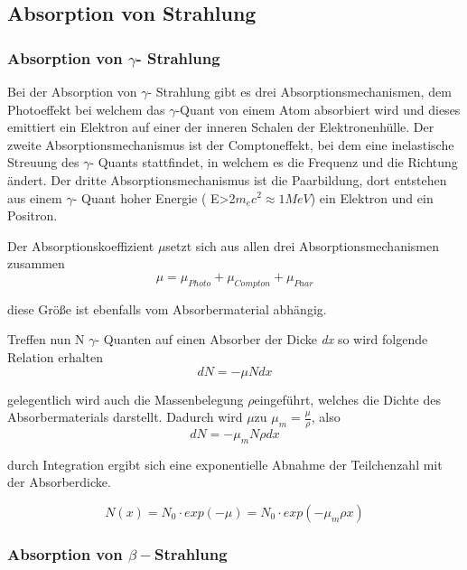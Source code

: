 \subsection{Absorption von Strahlung}


\subsubsection{Absorption von $\gamma$- Strahlung}

Bei der Absorption von $\gamma$- Strahlung gibt es drei Absorptionsmechanismen,
dem Photoeffekt bei welchem das $\gamma$-Quant von einem Atom absorbiert
wird und dieses emittiert ein Elektron auf einer der inneren Schalen
der Elektronenhülle. Der zweite Absorptionsmechanismus ist der Comptoneffekt,
bei dem eine inelastische Streuung des $\gamma$- Quants stattfindet,
in welchem es die Frequenz und die Richtung ändert. Der dritte Absorptionsmechanismus
ist die Paarbildung, dort entstehen aus einem $\gamma$- Quant hoher
Energie ( E>2$m_{e}c^{2}\approx 1MeV$) ein Elektron und ein Positron.

Der Absorptionskoeffizient $\mu$setzt sich aus allen drei Absorptionsmechanismen
zusammen
\begin{equation}
	\mu=\mu_{Photo}+\mu_{Compton}+\mu_{Paar}
\end{equation}


diese Größe ist ebenfalls vom Absorbermaterial abhängig.

Treffen nun N $\gamma$- Quanten auf einen Absorber der Dicke \emph{dx
}so wird folgende Relation erhalten
\begin{equation}
	dN=-\mu Ndx
\end{equation}


gelegentlich wird auch die Massenbelegung $\rho$eingeführt, welches
die Dichte des Absorbermaterials darstellt. Dadurch wird $\mu$zu
$\mu_{m}=\frac{\mu}{\rho}$, also 
\begin{equation}
	dN=-\mu_{m}N\rho dx
\end{equation}


durch Integration ergibt sich eine exponentielle Abnahme der Teilchenzahl
mit der Absorberdicke.

\begin{equation}
	N(x)=N_{0}\cdot exp(-\mu)=N_{0}\cdot exp(-\mu_{m}\rho x)
\end{equation}



\subsubsection{Absorption von $\beta-$Strahlung}

